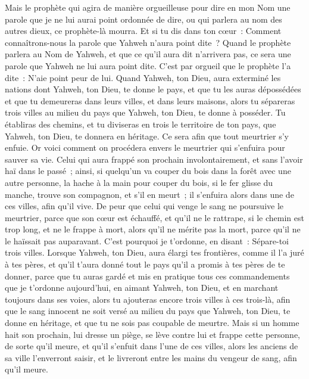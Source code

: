 \begin{multicols}{2}
Mais le prophète qui agira de manière orgueilleuse pour dire en mon Nom une parole que je ne lui aurai point ordonnée de dire, ou qui parlera au nom des autres dieux, ce prophète-là mourra.
Et si tu dis dans ton cœur~: Comment connaîtrons-nous la parole que Yahweh n'aura point dite~?
Quand le prophète parlera au Nom de Yahweh, et que ce qu'il aura dit n'arrivera pas, ce sera une parole que Yahweh ne lui aura point dite. C'est par orgueil que le prophète l'a dite~: N'aie point peur de lui.
\VerseOne{}Quand Yahweh, ton Dieu, aura exterminé les nations dont Yahweh, ton Dieu, te donne le pays, et que tu les auras dépossédées et que tu demeureras dans leurs villes, et dans leurs maisons,
alors tu sépareras trois villes au milieu du pays que Yahweh, ton Dieu, te donne à posséder.
Tu établiras des chemins, et tu diviseras en trois le territoire de ton pays, que Yahweh, ton Dieu, te donnera en héritage. Ce sera afin que tout meurtrier s'y enfuie.
Or voici comment on procédera envers le meurtrier qui s'enfuira pour sauver sa vie. Celui qui aura frappé son prochain involontairement, et sans l'avoir haï dans le passé~;
ainsi, si quelqu'un va couper du bois dans la forêt avec une autre personne, la hache à la main pour couper du bois, si le fer glisse du manche, trouve son compagnon, et s'il en meurt~; il s'enfuira alors dans une de ces villes, afin qu'il vive.
De peur que celui qui venge le sang ne poursuive le meurtrier, parce que son cœur est échauffé, et qu'il ne le rattrape, si le chemin est trop long, et ne le frappe à mort, alors qu'il ne mérite pas la mort, parce qu'il ne le haïssait pas auparavant.
C'est pourquoi je t'ordonne, en disant~: Sépare-toi trois villes.
Lorsque Yahweh, ton Dieu, aura élargi tes frontières, comme il l'a juré à tes pères, et qu'il t'aura donné tout le pays qu'il a promis à tes pères de te donner,
parce que tu auras gardé et mis en pratique tous ces commandements que je t'ordonne aujourd'hui, en aimant Yahweh, ton Dieu, et en marchant toujours dans ses voies, alors tu ajouteras encore trois villes à ces trois-là,
afin que le sang innocent ne soit versé au milieu du pays que Yahweh, ton Dieu, te donne en héritage, et que tu ne sois pas coupable de meurtre.
Mais si un homme hait son prochain, lui dresse un piège, se lève contre lui et frappe cette personne, de sorte qu'il meure, et qu'il s'enfuit dans l'une de ces villes,
alors les anciens de sa ville l'enverront saisir, et le livreront entre les mains du vengeur de sang, afin qu'il meure.

\end{multicols}
